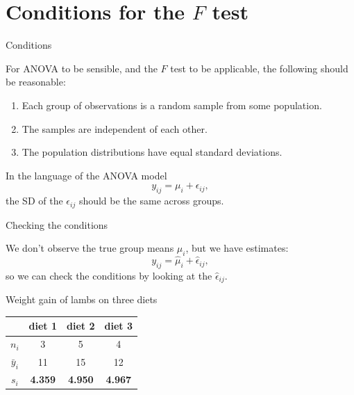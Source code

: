 \section{Conditions for the $F$ test}


\begin{frame}{Conditions}

    For ANOVA to be sensible, and the $F$ test to be applicable, the following should be reasonable:
    \begin{enumerate}
        \item Each group of observations is a random sample from some population.
        \item The samples are independent of each other.
        \item The population distributions have equal standard deviations.
    \end{enumerate}

    \vspace{2em}

    In the language of the ANOVA model
    \[
        y_{ij} = \mu_i + \epsilon_{ij} ,
    \]
    the SD of the $\epsilon_{ij}$ should be the same across groups.


\end{frame}


\begin{frame}{Checking the conditions}

    We don't observe the true group means $\mu_i$,
    but we have estimates:
    \[
        y_{ij} = \hat \mu_i + \hat \epsilon_{ij} ,
    \]
    so we can check the conditions by looking at the $\hat \epsilon_{ij}$.


    \pause
    \vspace{2em}

    Weight gain of lambs on three diets
    \begin{center}
        \begin{tabular}{cccc}
            & diet 1 & diet 2 & diet 3 \\
            \hline
            $n_i$ & 3 & 5 & 4 \\
            $\bar y_i$ & 11 & 15 & 12 \\
            \textbf{$s_i$} & \textbf{4.359} & \textbf{4.950} & \textbf{4.967} \\
        \end{tabular}
    \end{center}

\end{frame}


